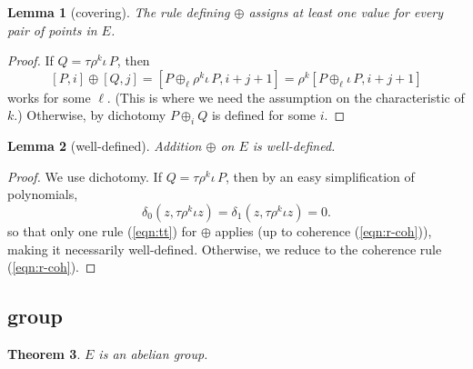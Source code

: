\documentclass[12pt]{article}
\newtheorem{theorem}{Theorem}[subsection]
\newtheorem{lemma}[theorem]{Lemma}
\begin{document}
\begin{lemma}[covering]  The rule defining $\oplus$ assigns
at least one value for  every pair of points in $E$.
\end{lemma}

\begin{proof}    If $Q=\tau \rho^k \iota\,P$, then
\begin{equation}\label{eqn:tt}
[P,i]\oplus [Q,j] = [P\oplus_\ell \rho^k \iota\,P,i+j+1] = \rho^k [P\oplus_\ell \iota\,P,i+j+1]
\end{equation}
works for some $\ell$.  (This is where we need the assumption on the characteristic of $k$.)
 Otherwise,  by dichotomy $P\oplus_i Q$ is defined for some $i$.
\end{proof}

\begin{lemma}[well-defined] Addition $\oplus$ on $E$ is well-defined.
\end{lemma}

\begin{proof}
We use dichotomy.  If $Q=\tau \rho^k \iota\,P$, then
by an easy simplification of polynomials,
\[
\delta_0(z,\tau\rho^k\iota z)=\delta_1(z,\tau\rho^k\iota z)=0.
\]
so that only one rule (\ref{eqn:tt}) for $\oplus$ applies (up to coherence (\ref{eqn:r-coh})), making
it necessarily well-defined.
Otherwise, we reduce to the coherence rule (\ref{eqn:r-coh}).
\end{proof}





\subsection{group}

\begin{theorem}  $E$ is an abelian group.
\end{theorem}
\end{document}
